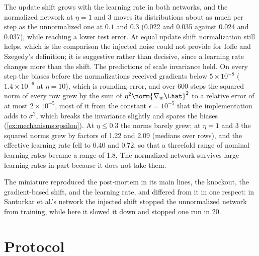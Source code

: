 \begin{refsection}
The update shift grows with the learning rate in both networks, and the normalized network at $\eta=1$ and $3$ moves its distributions about as much per step as the unnormalized one at $0.1$ and $0.3$ (0.022 and 0.035 against 0.024 and 0.037), while reaching a lower test error. At equal update shift normalization still helps, which is the comparison the injected noise could not provide for Ioffe and Szegedy's definition; it is suggestive rather than decisive, since a learning rate changes more than the shift. The predictions of scale invariance held. On every step the biases before the normalizations received gradients below $5\times10^{-8}$ ($1.4\times10^{-6}$ at $\eta=10$), which is rounding error, and over 600 steps the squared norm of every row grew by the sum of $\eta^2\norm{\nabla_w\Lhat}^2$ to a relative error of at most $2\times10^{-5}$, most of it from the constant $\epsilon=10^{-5}$ that the implementation adds to $\sigma^2$, which breaks the invariance slightly and spares the biases (\cref{ex:mechanisms:epsilon}). At $\eta\le0.3$ the norms barely grew; at $\eta=1$ and $3$ the squared norms grew by factors of 1.22 and 2.09 (medians over rows), and the effective learning rate fell to 0.40 and 0.72, so that a threefold range of nominal learning rates became a range of 1.8. The normalized network survives large learning rates in part because it does not take them.

The miniature reproduced the post-mortem in its main lines, the knockout, the gradient-based shift, and the learning rate, and differed from it in one respect: in Santurkar et al.'s network the injected shift stopped the unnormalized network from training, while here it slowed it down and stopped one run in 20.

\section{Protocol}\label{sec:mechanisms:protocol}


\end{refsection}
